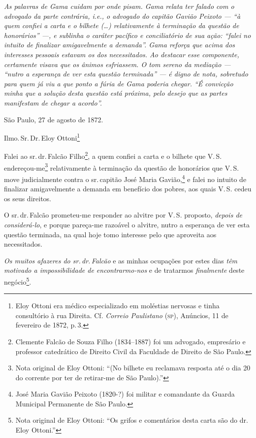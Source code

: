 \begin{didascalia}
\emph{As palavras de Gama cuidam por onde pisam. Gama relata ter falado
com o advogado da parte contrária, i.e., o advogado do capitão Gavião
Peixoto --- ``à quem confiei a carta e o bilhete (\ldots{}) relativamente à
terminação da questão de honorários'' ---, e sublinha o caráter pacífico e
conciliatório de sua ação: ``falei no intuito de finalizar amigavelmente
a demanda''. Gama reforça que acima dos interesses pessoais estavam os
dos necessitados. Ao destacar esse componente, certamente visava que os
ânimos esfriassem. O tom sereno da mediação --- ``nutro a esperança de ver
esta questão terminada'' --- é digno de nota, sobretudo para quem já viu a
que ponto a fúria de Gama poderia chegar. ``É convicção minha que a
solução desta questão está próxima, pelo desejo que as partes manifestam
de chegar a acordo''.}
\end{didascalia}


São Paulo, 27 de agosto de 1872.

Ilmo.\,Sr.\,Dr.\,Eloy Ottoni\footnote{ Eloy Ottoni era médico
  especializado em moléstias nervosas e tinha consultório à rua Direita.
  Cf. \emph{Correio Paulistano} (\textsc{sp}), Anúncios, 11 de fevereiro de 1872, p.\,3.}

Falei ao sr.\,dr.\,Falcão Filho\footnote{ Clemente Falcão de Souza Filho
  (1834--1887) foi um advogado, empresário e professor catedrático de
  Direito Civil da Faculdade de Direito de São Paulo.}, a quem confiei a
carta e o bilhete que V.\,S. endereçou-me\footnote{ Nota original de
  Eloy Ottoni: ``(No bilhete eu reclamava resposta até o dia 20 do
  corrente por ter de retirar-me de São Paulo).''} relativamente à
terminação da questão de honorários que V.\,S. move judicialmente contra
o sr.\,capitão José Maria Gavião,\footnote{ José Maria Gavião Peixoto
  (1820-?) foi militar e comandante da Guarda Municipal Permanente de
  São Paulo.} e falei no intuito de finalizar amigavelmente a demanda em
benefício dos pobres, aos quais V.\,S. cedeu os seus direitos.

O sr.\,dr.\,Falcão prometeu-me responder ao alvitre por V.\,S. proposto,
\emph{depois de considerá-lo}, e porque pareça-me razoável o alvitre,
nutro a esperança de ver esta questão terminada, na qual hoje tomo
interesse pelo que aproveita aos necessitados.

\emph{Os muitos afazeres do sr.\,dr.\,Falcão} e as minhas ocupações por
estes dias \emph{têm motivado a impossibilidade de encontrarmo-nos} e de
tratarmos \emph{finalmente} deste negócio\footnote{ Nota original de
  Eloy Ottoni: ``Os grifos e comentários desta carta são do dr.\,Eloy
  Ottoni.''}.

